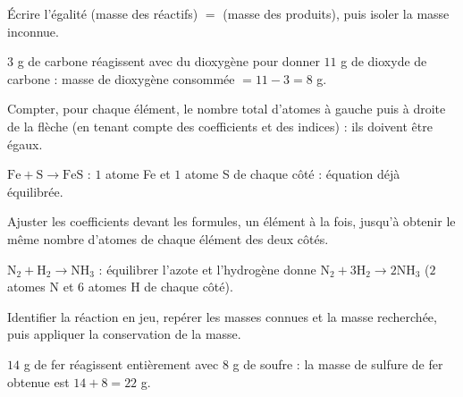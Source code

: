 Écrire l'égalité (masse des réactifs) $=$ (masse des produits), puis isoler la masse
inconnue.
\begin{exemple}
$3$ g de carbone réagissent avec du dioxygène pour donner $11$ g de dioxyde de carbone :
masse de dioxygène consommée $=11-3=8$ g.
\end{exemple}

Compter, pour chaque élément, le nombre total d'atomes à gauche puis à droite de la
flèche (en tenant compte des coefficients et des indices) : ils doivent être égaux.
\begin{exemple}
$\mathrm{Fe}+\mathrm{S}\to\mathrm{FeS}$ : $1$ atome Fe et $1$ atome S de chaque côté :
équation déjà équilibrée.
\end{exemple}

Ajuster les coefficients devant les formules, un élément à la fois, jusqu'à obtenir le
même nombre d'atomes de chaque élément des deux côtés.
\begin{exemple}
$\mathrm{N_2}+\mathrm{H_2}\to\mathrm{NH_3}$ : équilibrer l'azote et l'hydrogène donne
$\mathrm{N_2}+3\mathrm{H_2}\to2\mathrm{NH_3}$ ($2$ atomes N et $6$ atomes H de chaque
côté).
\end{exemple}

Identifier la réaction en jeu, repérer les masses connues et la masse recherchée, puis
appliquer la conservation de la masse.
\begin{exemple}
$14$ g de fer réagissent entièrement avec $8$ g de soufre : la masse de sulfure de fer
obtenue est $14+8=22$ g.
\end{exemple}

